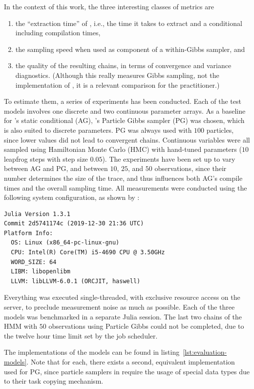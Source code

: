 In the context of this work, the three interesting classes of metrics are
\begin{enumerate}
  \firmlist
\item the \enquote{extraction time} of \autogibbsjl{}, i.e., the time it takes to extract and a
  conditional including compilation times,
\item the sampling speed when used as component of a within-Gibbs sampler, and
\item the quality of the resulting chains, in terms of convergence and variance diagnostics.
  (Although this really measures Gibbs sampling, not the implementation of \autogibbsjl{}, it is a
  relevant comparison for the practitioner.)
\end{enumerate}
To estimate them, a series of experiments has been conducted.  Each of the test models involves one
discrete and two continuous parameter arrays.  As a baseline for \autogibbsjl{}'s static conditional
(AG), \turingjl{}'s Particle Gibbs sampler (PG) was chosen, which is also suited to discrete
parameters.  PG was always used with \(100\) particles, since lower values did not lead to
convergent chains.  Continuous variables were all sampled using Hamiltonian Monte Carlo (HMC) with
hand-tuned parameters (\(10\) leapfrog steps with step size \(0.05\)).  The experiments have been
set up to vary between AG and PG, and between \(10\), \(25\), and \(50\) observations, since their
number determines the size of the trace, and thus influences both AG's compile times and the overall
sampling time.  All measurements were conducted using the following system configuration, as shown
by :
\begin{lstlisting}
Julia Version 1.3.1
Commit 2d5741174c (2019-12-30 21:36 UTC)
Platform Info:
  OS: Linux (x86_64-pc-linux-gnu)
  CPU: Intel(R) Core(TM) i5-4690 CPU @ 3.50GHz
  WORD_SIZE: 64
  LIBM: libopenlibm
  LLVM: libLLVM-6.0.1 (ORCJIT, haswell)
\end{lstlisting}
Everything was executed single-threaded, with exclusive resource access on the server, to preclude
measurement noise as much as possible.  Each of the three models was benchmarked in a separate Julia
session.  The last two chains of the HMM with \(50\) observations using Particle Gibbs could not be
completed, due to the twelve hour time limit set by the job scheduler.

The \dppljl{} implementations of the models can be found in listing~\ref{lst:evaluation-models}.
Note that for each, there exists a second, equivalent implementation used for PG, since particle
samplers in \turingjl{} require the usage of special data types due to their task copying mechanism.

